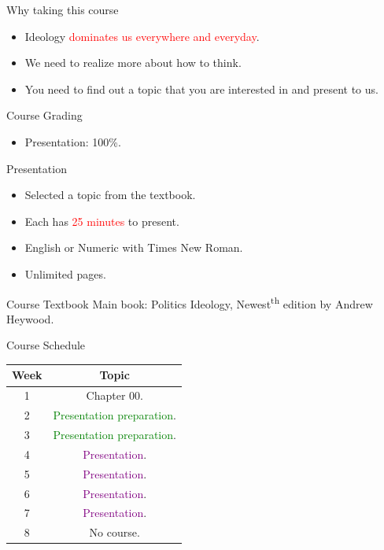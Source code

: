 \documentclass{beamer}
\begin{document}
\begin{frame}{Why taking this course}
\begin{itemize}
\item Ideology \textcolor{red}{dominates us everywhere and everyday}.
\item We need to realize more about how to think.
\item You need to find out a topic that you are interested in and present to us.
\end{itemize}
\end{frame}
\begin{frame}{Course Grading}
\begin{itemize}
\item Presentation: 100\%.
\end{itemize}
\end{frame}
\begin{frame}{Presentation}
\begin{itemize}
\item Selected a topic from the textbook.
\item Each has \textcolor{red}{25 minutes} to present.
\item English or Numeric with Times New Roman.
\item Unlimited pages.
\end{itemize}
\end{frame}
\begin{frame}{Course Textbook}
Main book: Politics Ideology, Newest\textsuperscript{th} edition by Andrew Heywood. \\
\end{frame}
\begin{frame}{Course Schedule}
\begin{center}
\begin{tabular}{|c|c|}
\hline
Week & Topic \\
\hline
1 & Chapter 00.\\
\hline
2 & \textcolor{Green}{Presentation preparation}.\\
\hline
3 & \textcolor{Green}{Presentation preparation}.\\
\hline
4 & \textcolor{purple}{Presentation}.\\
\hline
5 & \textcolor{purple}{Presentation}.\\
\hline
6 & \textcolor{purple}{Presentation}.\\
\hline
7 & \textcolor{purple}{Presentation}.\\
\hline
8 & No course.\\
\hline
\end{tabular}
\end{center}
\end{frame}
\end{document}
